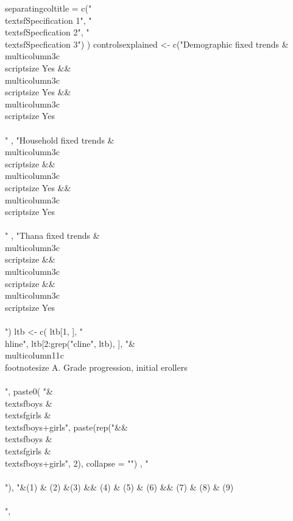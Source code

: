 \begin{Schunk}
\begin{Sinput}
    separatingcoltitle = c("\\textsf{Specification 1}", "\\textsf{Specfication 2}", "\\textsf{Specfication 3}")
  ) 
controlsexplained <- c("Demographic fixed trends & \\multicolumn{3}{c}{\\scriptsize Yes} && \\multicolumn{3}{c}{\\scriptsize Yes} && \\multicolumn{3}{c}{\\scriptsize Yes}\\\\"
    , 
    "Household fixed trends &  \\multicolumn{3}{c}{\\scriptsize } && \\multicolumn{3}{c}{\\scriptsize Yes} && \\multicolumn{3}{c}{\\scriptsize Yes} \\\\"
    , 
    "Thana fixed trends & \\multicolumn{3}{c}{\\scriptsize } && \\multicolumn{3}{c}{\\scriptsize } && \\multicolumn{3}{c}{\\scriptsize Yes}\\\\[1.5ex]")
ltb <- c(
  ltb[1, ], "\\hline",
  ltb[2:grep("cline", ltb), ],
  "&\\multicolumn{11}{c}{\\footnotesize A. Grade progression, initial erollers}\\\\",
    paste0(
      "&\\textsf{boys} & \\textsf{girls} & \\textsf{boys+girls}",
      paste(rep("&&\\textsf{boys} & \\textsf{girls} & \\textsf{boys+girls}", 2), collapse = "")
      , "\\\\"),
    "&(1) & (2) &(3) && (4) & (5) & (6) && (7) & (8) & (9)\\\\",

\end{Sinput}
\end{Schunk}
